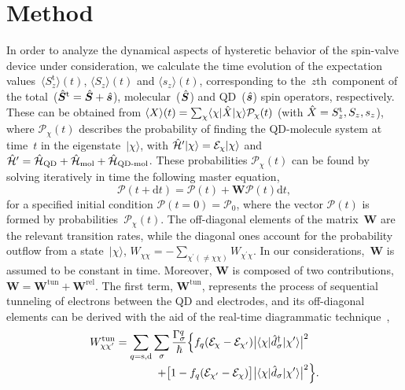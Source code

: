 \documentclass[doublecol]{epl2} %
\newcommand{\bra}[1]{\langle #1|}
\newcommand{\ket}[1]{|#1\rangle}
\newcommand{\En}{\mathcal{E}}
\newcommand{\s}{\sigma}
\newcommand{\G}{\Gamma}
\newcommand{\Ham}{\skew{3}{\hat}{\mathcal{H}}}
\newcommand{\op}[2]{\skew{#1}{\hat}{#2}}
\newcommand{\vopS}{\skew{3}{\hat}{\bm{S}}}
\newcommand{\vops}{\skew{3}{\hat}{\bm{s}}}
\newcommand{\vopSt}{\skew{3}{\hat}{\bm{S}}^\text{t}}
\newcommand{\Szt}{S_z^\text{t}}
\newcommand{\opd}{\skew{3}{\hat}{d}}
\newcommand{\matW}{\bm{W}}
\newcommand{\prob}{\mathcal{P}}
\begin{document}
\section{Method}
%
In order to analyze the dynamical aspects of hysteretic behavior of the spin-valve device under consideration, we calculate the time evolution of the expectation values~$\langle\Szt\rangle(t)$, $\langle S_z\rangle(t)$ and $\langle s_z\rangle(t)$, corresponding to the~$z$th~component of the total~(\mbox{$\vopSt=\vopS+\vops$}), molecular~($\vopS$) and QD~($\vops$) spin operators, respectively. These can be obtained from
%
$
	\langle X\rangle(t)
	=
	\sum_\chi
	\bra{\chi}
	\op{2}{X}
	\ket{\chi}\prob_\chi(t)
$
%
(with \mbox{$\op{2}{X}=\Szt,S_z,s_z$}), where $\prob_\chi(t)$ describes the probability of finding the QD-molecule system at time~$t$ in the eigenstate~$\ket{\chi}$, with \mbox{$\Ham^\prime \ket{\chi} = \En_\chi \ket{\chi}$} and
%
$
	\Ham^{\prime}
	=
	\Ham_\text{QD}
	+
	\Ham_\text{mol}
	+
	\Ham_\text{QD-mol}
$.
%
These probabilities $\prob_\chi(t)$ can be found by solving iteratively in time the following master equation,
%
\begin{equation}
	\bm{\prob}(t+\text{d}t)
	=
	\bm{\prob}(t)
 	+
 	\matW
 	\bm{\prob}(t)
 	\text{d}t
 	,
\end{equation}
%
for a specified initial condition \mbox{$\bm{\prob}(t=0) = \bm{\prob}_0$}, where the vector $\bm{\prob}(t)$ is formed by probabilities~$\prob_\chi(t)$. The off-diagonal elements of the matrix~$\matW$ are the relevant transition rates, while the diagonal ones account for the probability outflow from a state~$\ket{\chi}$,
%
$
	W_{\chi\chi}
	=
	\mbox{$-
	\sum_{\chi^\prime(\neq\chi\chi)}
	W_{\chi^\prime\chi}
	$}
$.
%
In our considerations,~$\matW$ is assumed to be constant in time.
%
Moreover, $\matW$ is composed of two contributions,
%
$
	\matW
	=
	\mbox{$\matW^\text{tun}
	+
	\matW^\text{rel}
	$}
$.
%
The first term, $\matW^\text{tun}$, represents the process of sequential tunneling of electrons between the QD and electrodes, and its off-diagonal elements can be derived with the aid of the real-time diagrammatic technique~\cite{Schoeller1994Dec,Thielmann2005Sep},
%
\begin{align}
   W_{\chi\chi^\prime}^\text{tun}
   =
   \sum_{q=\text{s,d}}
   \sum_{\s}
   \frac{\G_\s^q}{\hbar}
   \Big\{
   f_q(\En_\chi - \En_{\chi^\prime})
   \big|
   \bra{\chi}
   \opd_{\s}^\dagger
   \ket{\chi^\prime}
   \big|^2
   &
\nonumber\\[-2pt]
   +
   \big[
   1-f_q(\En_{\chi^\prime} - \En_{\chi}) \big]
   \big|
   \bra{\chi}
   \opd_{\s}
   \ket{\chi^\prime}
   \big|^2
   &
   \Big\}
   .
\end{align}
\end{document}
